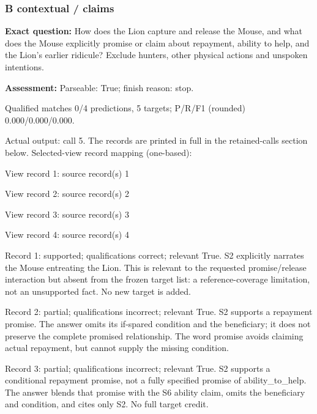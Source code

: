 \subsubsection*{B contextual / claims}

\noindent\textbf{Exact question:} How does the Lion capture and release the Mouse, and what does the Mouse explicitly promise or claim about repayment, ability to help, and the Lion's earlier ridicule? Exclude hunters, other physical actions and unspoken intentions.\par

\noindent\textbf{Assessment:} Parseable: True; finish reason: stop.

Qualified matches 0/4 predictions, 5 targets; P/R/F1 (rounded) 0.000/0.000/0.000.\par

Actual output: call 5. The records are printed in full in the retained-calls section below. Selected-view record mapping (one-based):

View record 1: source record(s) 1\par

View record 2: source record(s) 2\par

View record 3: source record(s) 3\par

View record 4: source record(s) 4\par

\noindent Record 1: supported; qualifications correct; relevant True. S2 explicitly narrates the Mouse entreating the Lion. This is relevant to the requested promise/release interaction but absent from the frozen target list: a reference-coverage limitation, not an unsupported fact. No new target is added.\par\smallskip

\noindent Record 2: partial; qualifications incorrect; relevant True. S2 supports a repayment promise. The answer omits its if-spared condition and the beneficiary; it does not preserve the complete promised relationship. The word promise avoids claiming actual repayment, but cannot supply the missing condition.\par\smallskip

\noindent Record 3: partial; qualifications incorrect; relevant True. S2 supports a conditional repayment promise, not a fully specified promise of ability\_to\_help. The answer blends that promise with the S6 ability claim, omits the beneficiary and condition, and cites only S2. No full target credit.\par\smallskip

